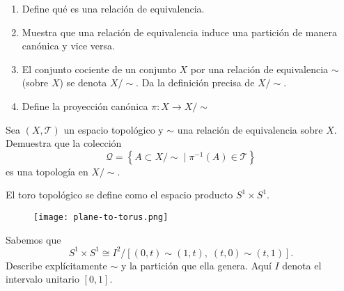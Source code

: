 \documentclass[b5paper,10pt,twoside]{book}
\begin{document}
\begin{problem}\hfill\null
\begin{enumerate}[label=(\roman*)]
\item Define qué es una relación de equivalencia.
\item Muestra que una relación de equivalencia induce una partición de manera canónica y vice versa.
\item El conjunto cociente de un conjunto \(X\) por una relación de equivalencia \(\sim\) (sobre \(X\)) se denota \(X/\!\!\sim\). Da la definición precisa de \(X/\!\!\sim\).
\item Define la proyección canónica \(\pi\colon X\to X/\!\!\sim\)
\end{enumerate}
\end{problem}


\begin{problem}
Sea \((X,\mathcal{T})\) 
un espacio topológico
y \(\sim\) una relación 
de equivalencia sobre
\(X\).
Demuestra 
que la colección
\[
\mathcal{Q} = \left\{ 
    A\subset X/\!\!\sim \;\bigg|\; \pi^{-1}(A)\in  \mathcal{T}
 \right\}
\]
es una topología
en \(X/\!\!\sim\).
\end{problem}

\pagebreak

\begin{problem}
El toro topológico se define como el espacio  producto   \(S^1\times S^1\).

\begin{figure}[!htb]
    \centering
    \texttt{[image: plane-to-torus.png]}
\end{figure}

Sabemos que 
\[
S^1\times S^1 \cong I^2 / [(0,t)\sim(1,t),\; (t,0)\sim (t,1)].
\]
Describe explícitamente \(\sim\) y la partición que ella genera.
Aquí \(I\) denota el 
intervalo unitario \([0,1]\).
\end{problem}
\end{document}
